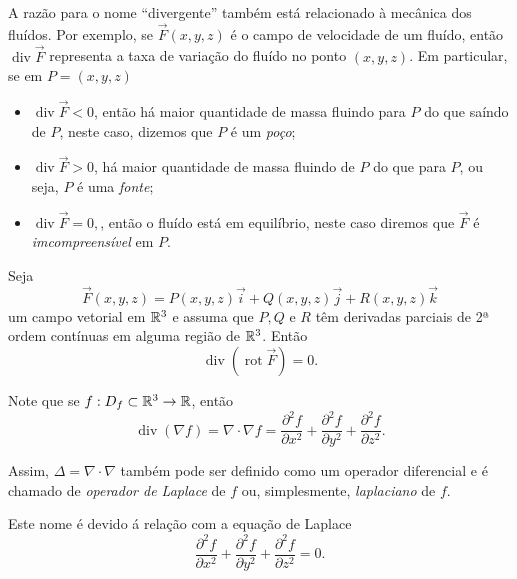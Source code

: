 A razão para o nome ``divergente'' também está relacionado à mecânica dos fluídos. Por exemplo, se \(\overrightarrow{F}(x,y,z)\) é o campo de velocidade de um fluído, então \(\operatorname{div}\overrightarrow{F}\) representa a taxa de variação do fluído no ponto \((x,y,z)\). Em particular, se em \(P = (x,y,z)\)
    \begin{itemize}
        \item \(\operatorname{div}\overrightarrow{F} < 0\), então há maior quantidade de massa fluindo para \(P\) do que saíndo de \(P\), neste caso, dizemos que \(P\) é um \textit{poço};
        \item \(\operatorname{div}\overrightarrow{F} > 0\), há maior quantidade de massa fluindo de \(P\) do que para \(P\), ou seja, \(P\) é uma \textit{fonte};
        \item \(\operatorname{div}\overrightarrow{F} = 0,\), então o fluído está em equilíbrio, neste caso diremos que \(\overrightarrow{F}\) é \textit{imcompreensível} em \(P\).
    \end{itemize}

\begin{exercise}
    Seja \[\overrightarrow{F}(x,y,z) = P(x,y,z)\overrightarrow{i} + Q(x,y,z)\overrightarrow{j} + R(x,y,z)\overrightarrow{k}\] um campo vetorial em \(\mathbb{R}^3\) e assuma que \(P,Q\) e \(R\) têm derivadas parciais de 2ª ordem contínuas em alguma região de \(\mathbb{R}^3\). Então \[\operatorname{div}(\operatorname{rot}\overrightarrow{F}) = 0.\]
\end{exercise}

\begin{remark}
    Note que se \(f:D_f\subset\mathbb{R}^3 \to \mathbb{R}\), então \[\operatorname{div}(\nabla f) = \nabla\cdot\nabla f = \frac{\partial^2 f}{\partial x^2} + \frac{\partial^2 f}{\partial y^2} + \frac{\partial^2 f}{\partial z^2}.\]

    Assim, \(\Delta = \nabla\cdot\nabla\) também pode ser definido como um operador diferencial e é chamado de \textit{operador de Laplace} de \(f\) ou, simplesmente, \textit{laplaciano} de \(f\).

    Este nome é devido á relação com a equação de Laplace \[\frac{\partial^2 f}{\partial x^2} + \frac{\partial^2 f}{\partial y^2} + \frac{\partial^2 f}{\partial z^2} = 0.\]
\end{remark}
